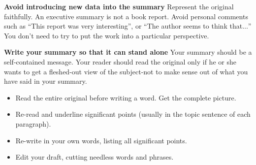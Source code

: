 \textbf{Avoid introducing new data into the summary}  
Represent the original faithfully. An executive summary is not a book
report. Avoid personal comments such as ``This report was very interesting'', or
``The author seems to think that$\ldots$'' You don't need to try to put the work
into a particular perspective.

\textbf{Write your summary so that it can stand alone} 
Your summary should be a self-contained message. Your reader should read the
original only if he or she wants to get a fleshed-out view of the subject-not to
make sense out of what you have said in your summary.

\begin{itemize}
\item Read the entire original before writing a word. Get the complete picture. 
\item Re-read and underline significant points (usually in the topic sentence of each paragraph). 
\item Re-write in your own words, listing all significant points. 
\item Edit your draft, cutting needless words and phrases.
\end{itemize}



